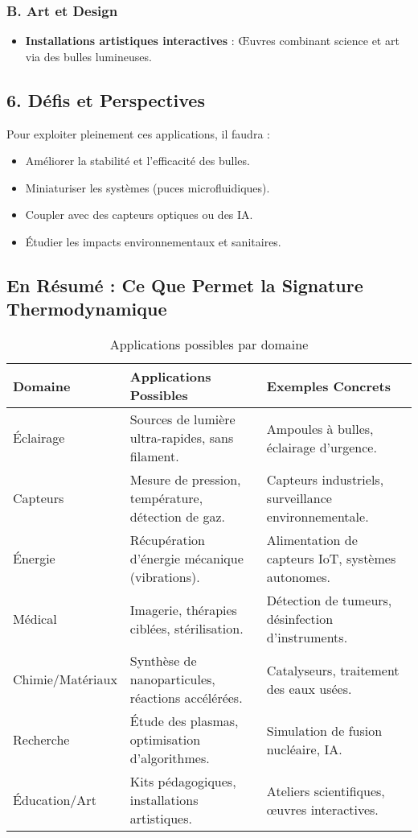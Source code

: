 \documentclass[a4paper,12pt]{article}
\begin{document}
\subsubsection*{B. Art et Design}
\begin{itemize}
    \item \textbf{Installations artistiques interactives} : Œuvres combinant science et art via des bulles lumineuses.
\end{itemize}

\subsection*{6. Défis et Perspectives}
Pour exploiter pleinement ces applications, il faudra :
\begin{itemize}
    \item Améliorer la stabilité et l’efficacité des bulles.
    \item Miniaturiser les systèmes (puces microfluidiques).
    \item Coupler avec des capteurs optiques ou des IA.
    \item Étudier les impacts environnementaux et sanitaires.
\end{itemize}

\subsection*{En Résumé : Ce Que Permet la Signature Thermodynamique}
\begin{table}[h]
\centering
\caption{Applications possibles par domaine}
\begin{tabular}{|p{3cm}|p{5cm}|p{5cm}|}
\hline
\textbf{Domaine} & \textbf{Applications Possibles} & \textbf{Exemples Concrets} \\ \hline
Éclairage & Sources de lumière ultra-rapides, sans filament. & Ampoules à bulles, éclairage d’urgence. \\ \hline
Capteurs & Mesure de pression, température, détection de gaz. & Capteurs industriels, surveillance environnementale. \\ \hline
Énergie & Récupération d’énergie mécanique (vibrations). & Alimentation de capteurs IoT, systèmes autonomes. \\ \hline
Médical & Imagerie, thérapies ciblées, stérilisation. & Détection de tumeurs, désinfection d’instruments. \\ \hline
Chimie/Matériaux & Synthèse de nanoparticules, réactions accélérées. & Catalyseurs, traitement des eaux usées. \\ \hline
Recherche & Étude des plasmas, optimisation d’algorithmes. & Simulation de fusion nucléaire, IA. \\ \hline
Éducation/Art & Kits pédagogiques, installations artistiques. & Ateliers scientifiques, œuvres interactives. \\ \hline
\end{tabular}
\end{table}
\end{document}

